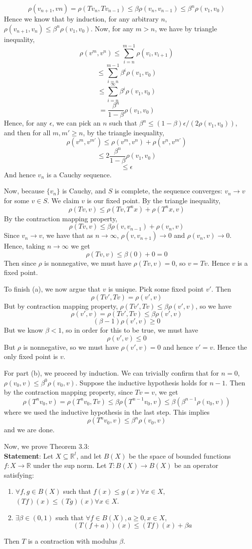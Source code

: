 \documentclass[10pt,letter]{article}
\begin{document}
\[ \rho(v_{n+1}, v{n}) = \rho(Tv_{n}, Tv_{n-1}) \le \beta \rho(v_n, v_{n-1}) \le \beta^n \rho(v_1, v_0) \]
Hence we know that by induction, for any arbitrary $n$, $\rho(v_{n+1}, v_n) \le \beta^n \rho(v_1, v_0)$. Now, for any $m > n$, we have by triangle inequality,
\[ \rho(v^m, v^n) \le \sum_{i=n}^{m-1} \rho(v_i, v_{i+1}) \]
\[ \le \sum_{i=n}^{m-1} \beta^i \rho(v_1, v_0) \]
\[ \le \sum_{i=n}^\infty \beta^i \rho(v_1, v_0) \]
\[ = \frac{\beta^n}{1-\beta} \rho(v_1, v_0)\]
Hence, for any $\epsilon$, we can pick an $n$ such that $\beta^n \le (1-\beta)\epsilon / (2  \rho(v_1, v_0)) $, and then for all $m, m' \ge n$, by the triangle inequality,
\[ \rho(v^m, v^{m'}) \le \rho(v^m, v^n) + \rho(v^n, v^{m'}) \]
\[ \le 2 \frac{\beta^n}{1-\beta} \rho(v_1, v_0)\]
\[ \le \epsilon \]
And hence $v_n$ is a Cauchy sequence.

Now, because $\{v_n \} $ is Cauchy, and $S$ is complete, the sequence converges: $v_n \to v$ for some $v \in S$. We claim $v$ is our fixed point. By the triangle inequality,
\[ \rho(Tv, v) \le \rho(Tv, T^n x) + \rho(T^n x, v) \]
By the contraction mapping property,
\[ \rho(Tv, v) \le \beta \rho(v, v_{n-1}) + \rho(v_n, v) \]
Since $v_n \to v$, we have that as $n \to \infty$, $\rho(v, v_{n+1}) \to 0$ and $ \rho(v_n, v) \to 0$. Hence, taking $n\to \infty$ we get
\[ \rho(Tv, v) \le \beta(0) + 0 = 0 \]
Then since $\rho$ is nonnegative, we must have $\rho(Tv, v) = 0$, so $v = Tv$. Hence $v$ is a fixed point.

To finish (a), we now argue that $v$ is unique. Pick some fixed point $v'$. Then
\[ \rho(Tv', Tv) = \rho(v', v) \]
But by contraction mapping property, $\rho(Tv', Tv) \le \beta \rho(v', v)$, so we have
\[ \rho(v', v) = \rho(Tv', Tv) \le \beta \rho(v', v) \]
\[ (\beta - 1) \rho(v', v) \ge 0 \]
But we know $\beta < 1$, so in order for this to be true, we must have
\[ \rho(v', v) \le 0 \]
But $\rho$ is nonnegative, so we must have $\rho(v', v) = 0$ and hence $v' = v$. Hence the only fixed point is $v$.

For part (b), we proceed by induction. We can trivially confirm that for $n=0$, $\rho(v_0, v) \le \beta^0 \rho(v_0, v)$. Suppose the inductive hypothesis holds for $n-1$. Then by the contraction mapping property, since $Tv = v$, we get
\[ \rho(T^n v_0, v) = \rho(T^n v_0, Tv) \le \beta \rho(T^{n-1} v_0, v) \le \beta (\beta^{n-1} \rho(v_0, v)) \]
where we used the inductive hypothesis in the last step.
This implies
\[\rho(T^n v_0, v) \le \beta^n \rho(v_0, v) \]
and we are done.

Now, we prove Theorem 3.3: \\
\textbf{Statement}: Let $X \subseteq \mathbb{R}^l$, and let $B(X)$ be the space of bounded functions $f:X \to \mathbb{R}$ under the sup norm. Let $T: B(X) \to B(X)$ be an operator satisfying:
\begin{enumerate}[label=(\alph*)]
\item $\forall f, g \in B(X)$ such that $f(x) \le g(x) \forall x\in X$, $(Tf)(x) \le (Tg)(x) \forall x \in X$.
\item $\exists \beta \in (0,1)$ such that $\forall f \in B(X), a \ge 0, x\in X$,
\[ (T(f + a))(x) \le (Tf)(x)+\beta a \]
\end{enumerate}
Then $T$ is a contraction with modulus $\beta$.
\end{document}
